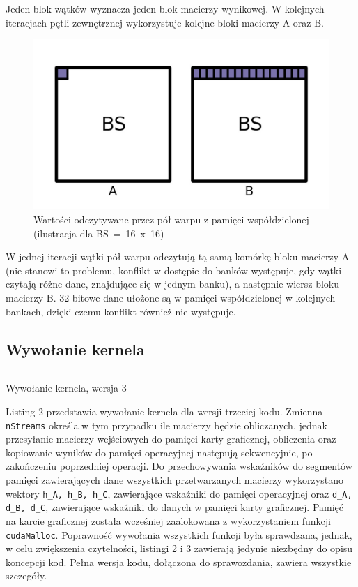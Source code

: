 \documentclass[12pt,a4paper]{article}
\begin{document}
Jeden blok wątków wyznacza jeden blok macierzy wynikowej. W kolejnych iteracjach pętli zewnętrznej wykorzystuje kolejne bloki macierzy A oraz B.

\begin{figure}[H]
  \centering
  \includegraphics[width=0.633\linewidth, trim={0 50px 0 20px}, clip=true]{images/3.jpg}
  \caption{Wartości odczytywane przez pół warpu z pamięci współdzielonej (ilustracja dla BS~=~16~x~16)}
  \label{fig:matrix2}
\end{figure}

\vspace{-0.5cm}

W jednej iteracji wątki pół-warpu odczytują tą samą komórkę bloku macierzy A (nie stanowi to problemu, konflikt w dostępie do banków występuje, gdy wątki czytają różne dane, znajdujące się w jednym banku), a następnie wiersz bloku macierzy B. 32 bitowe dane ułożone są w pamięci współdzielonej w kolejnych bankach, dzięki czemu konflikt również nie występuje.


\subsection{Wywołanie kernela}

\begin{listing}[H]
\inputminted{cuda}{listings/invocation_sync.cu}
\caption{Wywołanie kernela, wersja 3}
\label{lst:sync}
\end{listing}

Listing 2 przedstawia wywołanie kernela dla wersji trzeciej kodu. Zmienna \verb|nStreams| określa w tym przypadku ile macierzy będzie obliczanych, jednak przesyłanie macierzy wejściowych do pamięci karty graficznej, obliczenia oraz kopiowanie wyników do pamięci operacyjnej następują sekwencyjnie, po zakończeniu poprzedniej operacji. Do przechowywania wskaźników do segmentów pamięci zawierających dane wszystkich przetwarzanych macierzy wykorzystano wektory \verb|h_A, h_B, h_C|, zawierające wskaźniki do pamięci operacyjnej oraz \verb|d_A, d_B, d_C|, zawierające wskaźniki do danych w pamięci karty graficznej. Pamięć na karcie graficznej została wcześniej zaalokowana z wykorzystaniem funkcji \verb|cudaMalloc|. Poprawność wywołania wszystkich funkcji była sprawdzana, jednak, w celu zwiększenia czytelności, listingi 2 i 3 zawierają jedynie niezbędny do opisu koncepcji kod. Pełna wersja kodu, dołączona do sprawozdania, zawiera wszystkie szczegóły.
\end{document}
